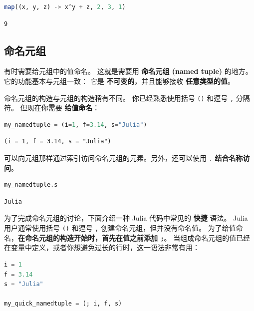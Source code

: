 \documentclass[
  notoc %
]{tufte-book}
\newcommand{\passthrough}[1]{#1}
\begin{document}
\begin{lstlisting}[language=Julia]
map((x, y, z) -> x^y + z, 2, 3, 1)
\end{lstlisting}

\begin{lstlisting}[language=Output]
9
\end{lstlisting}

\hypertarget{sec:namedtuple}{%
\subsection{命名元组}\label{sec:namedtuple}}

有时需要给元组中的值命名。 这就是需要用 \textbf{命名元组 (named tuple)}
的地方。 它的功能基本与元组一致： 它是 \textbf{不可变的}，并且能够接收
\textbf{任意类型的值}。

命名元组的构造与元组的构造稍有不同。 你已经熟悉使用括号
\passthrough{\lstinline!()!} 和逗号 \passthrough{\lstinline!,!} 分隔符。
但现在你需要 \textbf{给值命名}：

\begin{lstlisting}[language=Julia]
my_namedtuple = (i=1, f=3.14, s="Julia")
\end{lstlisting}

\begin{lstlisting}[language=Output]
(i = 1, f = 3.14, s = "Julia")
\end{lstlisting}

可以向元组那样通过索引访问命名元组的元素。另外，还可以使用
\passthrough{\lstinline!.!} \textbf{结合名称访问}。

\begin{lstlisting}[language=Julia]
my_namedtuple.s
\end{lstlisting}

\begin{lstlisting}[language=Output]
Julia
\end{lstlisting}

为了完成命名元组的讨论，下面介绍一种 Julia 代码中常见的 \textbf{快捷}
语法。 Julia 用户通常使用括号 \passthrough{\lstinline!()!} 和逗号
\passthrough{\lstinline!,!} 创建命名元组，但并没有命名值。
为了给值命名，\textbf{在命名元组的构造开始时，首先在值之前添加
\passthrough{\lstinline!;!}}。
当组成命名元组的值已经在变量中定义，或者你想避免过长的行时，这一语法非常有用：

\begin{lstlisting}[language=Julia]
i = 1
f = 3.14
s = "Julia"

my_quick_namedtuple = (; i, f, s)
\end{lstlisting}
\end{document}
